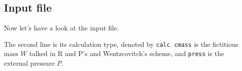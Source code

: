 \subsection{Input file}

Now let's have a look at the input file.

The second line is its calculation type, denoted by
\texttt{calc}. \texttt{cmass} is the fictitious mass $W$ talked
in R and P's and Wentzcovitch's scheme, and \texttt{press} is the
external pressure $P$.